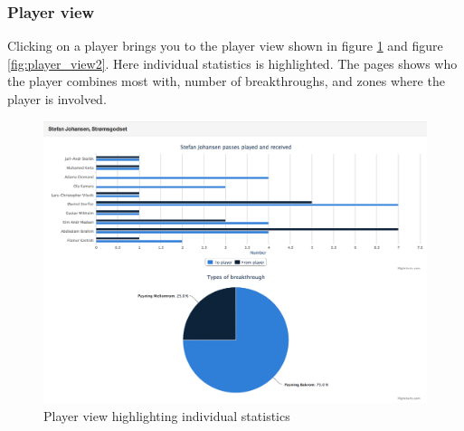 \subsubsection{Player view}

Clicking on a player brings you to the player view shown in figure \ref{fig:player_view1} and figure \ref{fig:player_view2}. Here individual statistics is highlighted. The pages shows who the player combines most with, number of breakthroughs, and zones where the player is involved.

\begin{figure}[H]
\centering
\includegraphics[width=1\textwidth]{images/general/player_view1.png}
\caption{Player view highlighting individual statistics}
\label{fig:player_view1}
\end{figure}

